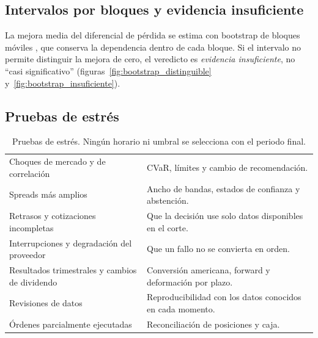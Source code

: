 
\subsection{Intervalos por bloques y evidencia insuficiente}\label{sec:bootstrap}

La mejora media del diferencial de pérdida se estima con bootstrap de bloques móviles \citep{kunsch1989},
que conserva la dependencia dentro de cada bloque. Si el intervalo no permite distinguir la mejora de cero,
el veredicto es \emph{evidencia insuficiente}, no ``casi significativo''
(figuras~\ref{fig:bootstrap_distinguible} y~\ref{fig:bootstrap_insuficiente}).



\subsection{Pruebas de estrés}\label{sec:estres}

\begin{table}[H]
\centering\small
\caption{Pruebas de estrés. Ningún horario ni umbral se selecciona con el periodo final.}
\label{tab:estres}
\begin{tabularx}{\linewidth}{@{}l Y@{}}
\toprule
{} & \\
\midrule
Choques de mercado y de correlación & CVaR, límites y cambio de recomendación.\\
Spreads más amplios & Ancho de bandas, estados de confianza y abstención.\\
Retrasos y cotizaciones incompletas & Que la decisión use solo datos disponibles en el corte.\\
Interrupciones y degradación del proveedor & Que un fallo no se convierta en orden.\\
Resultados trimestrales y cambios de dividendo & Conversión americana, forward y deformación por plazo.\\
Revisiones de datos & Reproducibilidad con los datos conocidos en cada momento.\\
Órdenes parcialmente ejecutadas & Reconciliación de posiciones y caja.\\
\bottomrule
\end{tabularx}
\end{table}

